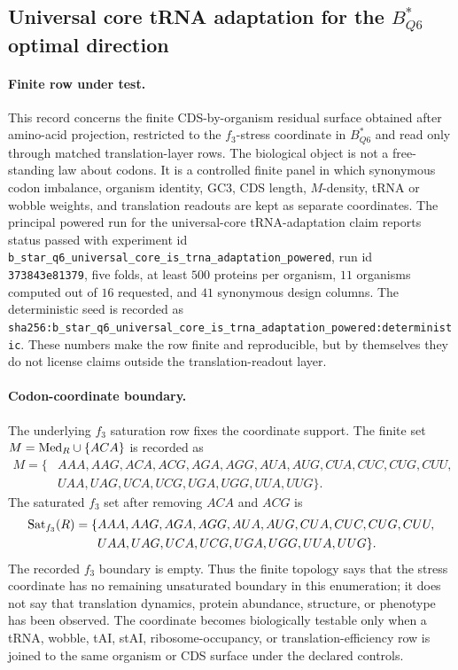 
\subsection{Universal core tRNA adaptation for the $B^*_{Q6}$ optimal direction}
\label{sec:bioreality-q6-universal-core-trna-adaptation}

\paragraph{Finite row under test.}
This record concerns the finite CDS-by-organism residual surface obtained after amino-acid projection, restricted to the $f_3$-stress coordinate in $B^*_{Q6}$ and read only through matched translation-layer rows. The biological object is not a free-standing law about codons. It is a controlled finite panel in which synonymous codon imbalance, organism identity, GC3, CDS length, $M$-density, tRNA or wobble weights, and translation readouts are kept as separate coordinates. The principal powered run for the universal-core tRNA-adaptation claim reports status passed with experiment id \texttt{b\_star\_q6\_universal\_core\_is\_trna\_adaptation\_powered}, run id \texttt{373843e81379}, five folds, at least $500$ proteins per organism, $11$ organisms computed out of $16$ requested, and $41$ synonymous design columns. The deterministic seed is recorded as \texttt{sha256:b\_star\_q6\_universal\_core\_is\_trna\_adaptation\_powered:deterministic}. These numbers make the row finite and reproducible, but by themselves they do not license claims outside the translation-readout layer.

\paragraph{Codon-coordinate boundary.}
The underlying $f_3$ saturation row fixes the coordinate support. The finite set $M={\rm Med}_R\cup\{ACA\}$ is recorded as
$$
\begin{aligned}
M=\{&AAA,AAG,ACA,ACG,AGA,AGG,AUA,AUG,CUA,CUC,CUG,CUU,\\
&UAA,UAG,UCA,UCG,UGA,UGG,UUA,UUG\}.
\end{aligned}
$$
The saturated $f_3$ set after removing $ACA$ and $ACG$ is
$$
\begin{aligned}
{\rm Sat}_{f_3}(R)=\{&AAA,AAG,AGA,AGG,AUA,AUG,CUA,CUC,CUG,CUU,\\
&UAA,UAG,UCA,UCG,UGA,UGG,UUA,UUG\}.
\end{aligned}
$$
The recorded $f_3$ boundary is empty. Thus the finite topology says that the stress coordinate has no remaining unsaturated boundary in this enumeration; it does not say that translation dynamics, protein abundance, structure, or phenotype has been observed. The coordinate becomes biologically testable only when a tRNA, wobble, tAI, stAI, ribosome-occupancy, or translation-efficiency row is joined to the same organism or CDS surface under the declared controls.

